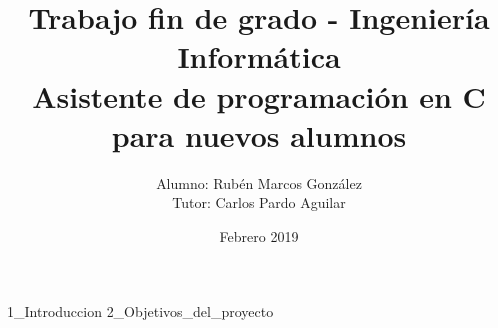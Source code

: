 \documentclass{book}
\title{Trabajo fin de grado - Ingeniería Informática\\Asistente de programación en C para nuevos alumnos}
\author{Alumno: Rubén Marcos González\\Tutor: Carlos Pardo Aguilar}
\date{Febrero 2019}
\begin{document}
\maketitle
{1_Introduccion}
{2_Objetivos_del_proyecto}
\end{document}
